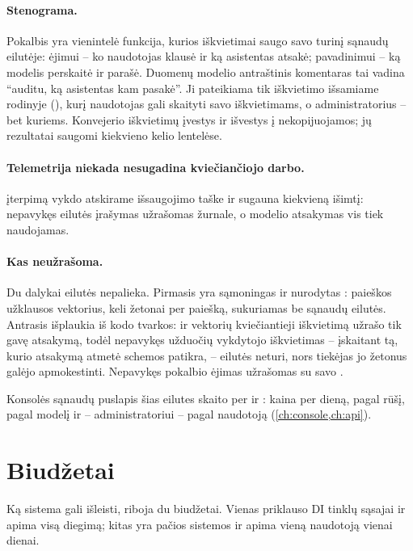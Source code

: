 \paragraph{Stenograma.} Pokalbis yra vienintelė funkcija, kurios iškvietimai saugo savo turinį
sąnaudų eilutėje: ėjimui -- ko naudotojas klausė ir ką asistentas atsakė; pavadinimui -- ką
modelis perskaitė ir parašė. Duomenų modelio antraštinis komentaras tai vadina \enquote{auditu, ką
asistentas kam pasakė}. Ji pateikiama tik iškvietimo išsamiame rodinyje
(), kurį naudotojas gali skaityti savo iškvietimams, o
administratorius -- bet kuriems. Konvejerio iškvietimų įvestys ir išvestys į 
nekopijuojamos; jų rezultatai saugomi kiekvieno kelio lentelėse.

\paragraph{Telemetrija niekada nesugadina kviečiančiojo darbo.}  įterpimą
vykdo atskirame išsaugojimo taške ir sugauna kiekvieną išimtį: nepavykęs eilutės įrašymas
užrašomas žurnale, o modelio atsakymas vis tiek naudojamas.

\paragraph{Kas neužrašoma.} Du dalykai eilutės nepalieka. Pirmasis yra sąmoningas ir nurodytas
: paieškos užklausos vektorius, keli žetonai per paiešką,
sukuriamas be sąnaudų eilutės. Antrasis išplaukia iš kodo tvarkos:  ir
vektorių kviečiantieji iškvietimą užrašo tik gavę atsakymą, todėl nepavykęs užduočių vykdytojo
iškvietimas -- įskaitant tą, kurio atsakymą atmetė schemos patikra, -- eilutės neturi, nors
tiekėjas jo žetonus galėjo apmokestinti. Nepavykęs pokalbio ėjimas užrašomas su savo
.

Konsolės sąnaudų puslapis šias eilutes skaito per  ir
: kaina per dieną, pagal rūšį, pagal modelį ir --
administratoriui -- pagal naudotoją (\cref{ch:console,ch:api}).


\section{Biudžetai}\label{sec:models:budgets}

Ką sistema gali išleisti, riboja du biudžetai. Vienas priklauso DI tinklų sąsajai ir apima visą
diegimą; kitas yra pačios sistemos ir apima vieną naudotoją vienai dienai.


